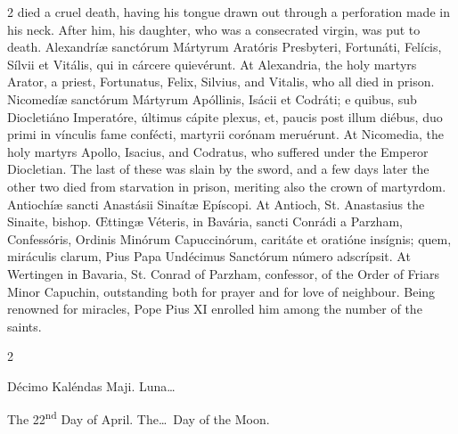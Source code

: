 \begin{paracol}{2}
 died a cruel death, having his tongue drawn out through a perforation made 
 in his neck. After him, his daughter, who was a consecrated virgin, 
 was put to death.
\switchcolumn*
{}
Alexandríæ sanctórum 
 Mártyrum Aratóris Presbyteri, Fortunáti, Felícis, Sílvii et Vitális, qui in cárcere quievérunt.
\switchcolumn
{}
At Alexandria, the holy martyrs 
 Arator, a priest, Fortunatus, Felix, Silvius, and Vitalis, who all died in 
 prison.
\switchcolumn*
{}
Nicomedíæ sanctórum 
 Mártyrum Apóllinis, Isácii et Codráti; e quibus, sub Diocletiáno Imperatóre, 
 últimus cápite plexus, et, paucis post illum diébus, duo primi in vínculis 
 fame confécti, martyrii corónam meruérunt.
\switchcolumn
{}
At Nicomedia, the holy martyrs 
 Apollo, Isacius, and Codratus, who suffered under the Emperor Diocletian. 
 The last of these was slain by the sword, and a few days later the other two 
 died from starvation in prison, meriting also the crown of martyrdom.
\switchcolumn*
{}
Antiochíæ sancti 
 Anastásii Sinaítæ Epíscopi.
\switchcolumn
{}
At Antioch, St. Anastasius the 
 Sinaite, bishop.
\switchcolumn*
{}
Œttingæ Véteris, in 
 Bavária, sancti Conrádi a Parzham, Confessóris, Ordinis Minórum Capuccinórum, 
 caritáte et oratióne insígnis; quem, miráculis clarum, Pius Papa Undécimus 
 Sanctórum número adscrípsit.
\switchcolumn
{}
At Wertingen in Bavaria, St. Conrad 
 of Parzham, confessor, of the Order of Friars Minor Capuchin, outstanding 
 both for prayer and for love of neighbour. Being renowned for 
 miracles, Pope Pius XI enrolled him among the number of the saints.
\switchcolumn*
{}
\end{paracol}


\begin{paracol}{2}
\begin{center}{\color{gregoriocolor} Décimo Kaléndas Maji. 
 Luna\dots\ }\end{center}
\switchcolumn
{}
\begin{center}{\color{gregoriocolor} The 
 22\textsuperscript{nd} Day of April. The\dots\ Day of the Moon.}\end{center}
\end{paracol}

